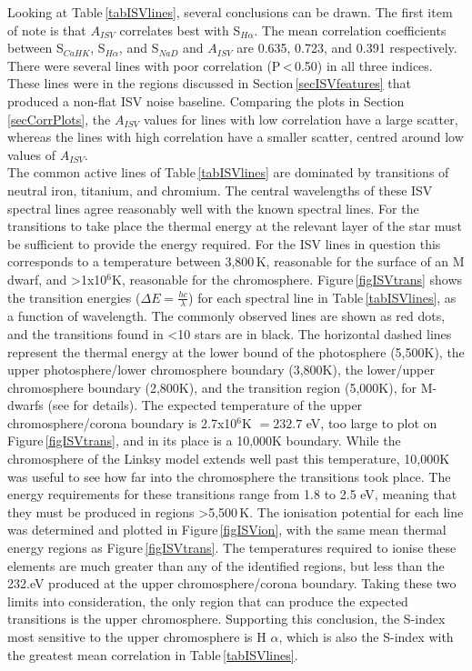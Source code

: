 Looking at Table\,\ref{tabISVlines}, several conclusions can be drawn. The first item of note is that $A_{ISV}$ correlates best with S$_{H\alpha}$. The mean correlation coefficients between S$_{CaHK}$, S$_{H\alpha}$, and S$_{NaD}$ and $A_{ISV}$ are 0.635, 0.723, and 0.391 respectively. There were several lines with poor correlation (P\,\textless\,0.50) in all three indices. These lines were in the regions discussed in Section\,\ref{secISVfeatures} that produced a non-flat ISV noise baseline. Comparing the plots in Section\,\ref{secCorrPlots}, the $A_{ISV}$ values for lines with low correlation have a large scatter, whereas the lines with high correlation have a smaller scatter, centred around low values of $A_{ISV}$.\\

The common active lines of Table\,\ref{tabISVlines} are dominated by transitions of neutral iron, titanium, and chromium. The central wavelengths of these ISV spectral lines agree reasonably well with the known spectral lines. For the transitions to take place the thermal energy at the relevant layer of the star must be sufficient to provide the energy required. For the ISV lines in question this corresponds to a temperature between 3,800\,K, reasonable for the surface of an M dwarf, and \textgreater1x10$^{6}$K, reasonable for the chromosphere. Figure\,\ref{figISVtrans} shows the transition energies ($\Delta E = \frac{hc}{\lambda}$) for each spectral line in Table\,\ref{tabISVlines}, as a function of wavelength. The commonly observed lines are shown as red dots, and the transitions found in \textless10 stars are in black. The horizontal dashed lines represent the thermal energy at the lower bound of the photosphere (5,500K), the upper photosphere/lower chromosphere boundary (3,800K), the lower/upper chromosphere boundary (2,800K), and the transition region (5,000K), for M-dwarfs (see \citealt{2017Linsky} for details). The expected temperature of the upper chromosphere/corona boundary is 2.7x10$^{6}$K $=232.7$ eV, too large to plot on Figure\,\ref{figISVtrans}, and in its place is a 10,000K boundary. While the chromosphere of the Linksy model extends well past this temperature, 10,000K was useful to see how far into the chromosphere the transitions took place. The energy requirements for these transitions range from 1.8 to 2.5 eV, meaning that they must be produced in regions \textgreater5,500\,K. The ionisation potential for each line was determined and plotted in Figure\,\ref{figISVion}, with the same mean thermal energy regions as Figure\,\ref{figISVtrans}. The temperatures required to ionise these elements are much greater than any of the identified regions, but less than the 232.eV produced at the upper chromosphere/corona boundary. Taking these two limits into consideration, the only region that can produce the expected transitions is the upper chromosphere. Supporting this conclusion, the S-index most sensitive to the upper chromosphere is H $\alpha$, which is also the S-index with the greatest mean correlation in Table\,\ref{tabISVlines}.\\

